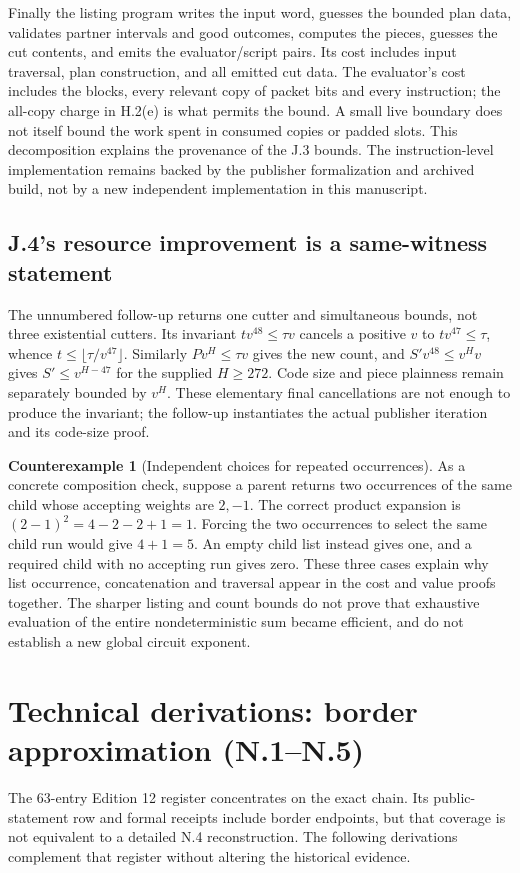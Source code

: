 \documentclass[11pt,letterpaper]{article}
\theoremstyle{definition}\newtheorem{definition}[theorem]{Definition}\newtheorem{example}[theorem]{Example}
\newtheorem{counterexample}[theorem]{Counterexample}
\theoremstyle{remark}\newtheorem{remark}[theorem]{Remark}
\begin{document}
Finally the listing program writes the input word, guesses the bounded plan data, validates partner intervals and good outcomes, computes the pieces, guesses the cut contents, and emits the evaluator/script pairs. Its cost includes input traversal, plan construction, and all emitted cut data. The evaluator's cost includes the blocks, every relevant copy of packet bits and every instruction; the all-copy charge in H.2(e) is what permits the bound. A small live boundary does not itself bound the work spent in consumed copies or padded slots. This decomposition explains the provenance of the J.3 bounds. The instruction-level implementation remains backed by the publisher formalization and archived build, not by a new independent implementation in this manuscript.

\subsection{J.4's resource improvement is a same-witness statement}
The unnumbered follow-up returns one cutter and simultaneous bounds, not three existential cutters. Its invariant $tv^{48}\le\tau v$ cancels a positive $v$ to $tv^{47}\le\tau$, whence $t\le\lfloor\tau/v^{47}\rfloor$. Similarly $Pv^H\le\tau v$ gives the new count, and $S'v^{48}\le v^Hv$ gives $S'\le v^{H-47}$ for the supplied $H\ge272$. Code size and piece plainness remain separately bounded by $v^H$. These elementary final cancellations are not enough to produce the invariant; the follow-up instantiates the actual publisher iteration and its code-size proof.

\begin{counterexample}[Independent choices for repeated occurrences]\label{ex:occurrences}
As a concrete composition check, suppose a parent returns two occurrences of the same child whose accepting weights are $2,-1$. The correct product expansion is $(2-1)^2=4-2-2+1=1$. Forcing the two occurrences to select the same child run would give $4+1=5$. An empty child list instead gives one, and a required child with no accepting run gives zero. These three cases explain why list occurrence, concatenation and traversal appear in the cost and value proofs together. The sharper listing and count bounds do not prove that exhaustive evaluation of the entire nondeterministic sum became efficient, and do not establish a new global circuit exponent.
\end{counterexample}


\section{Technical derivations: border approximation (N.1--N.5)}\label{sec:borderdetail}
The 63-entry Edition 12 register concentrates on the exact chain. Its public-statement row and formal receipts include border endpoints, but that coverage is not equivalent to a detailed N.4 reconstruction. The following derivations complement that register without altering the historical evidence.
\end{document}
